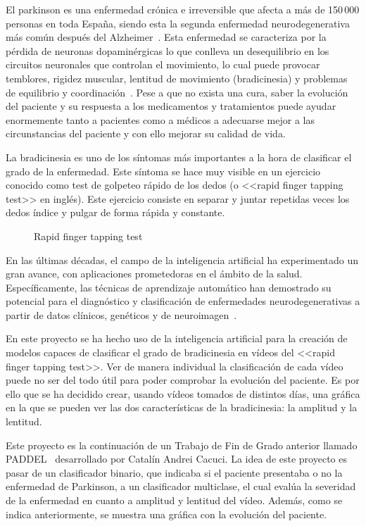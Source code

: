 
El parkinson es una enfermedad crónica e irreversible que afecta a más de 150\,000 personas en toda España, siendo esta la segunda enfermedad neurodegenerativa más común después del Alzheimer~\cite{brainsci11081027}. Esta enfermedad se caracteriza por la pérdida de neuronas dopaminérgicas lo que conlleva un desequilibrio en los circuitos neuronales que controlan el movimiento, lo cual puede provocar temblores, rigidez muscular, lentitud de movimiento (bradicinesia) y problemas de equilibrio y coordinación~\cite{Poewe_Seppi_Tanner_Halliday_Brundin_Volkmann_Schrag_Lang_2017}.
Pese a que no exista una cura, saber la evolución del paciente y su respuesta a los medicamentos y tratamientos puede ayudar enormemente tanto a pacientes como a médicos a adecuarse mejor a las circunstancias del paciente y con ello mejorar su calidad de vida.
 
La bradicinesia es uno de los síntomas más importantes a la hora de clasificar el grado de la enfermedad. Este síntoma se hace muy visible en un ejercicio conocido como test de golpeteo rápido de los dedos (o <<rapid finger tapping test>> en inglés). Este ejercicio consiste en separar y juntar repetidas veces los dedos índice y pulgar de forma rápida y constante.


\begin{figure}
    \centering
    \caption{Rapid finger tapping test}
    \label{fig:finger-tapping-test}
\end{figure}

En las últimas décadas, el campo de la inteligencia artificial ha experimentado un gran avance, con aplicaciones prometedoras en el ámbito de la salud. Específicamente, las técnicas de aprendizaje automático han demostrado su potencial para el diagnóstico y clasificación de enfermedades neurodegenerativas a partir de datos clínicos, genéticos y de neuroimagen~\cite{CardiacCare}.

En este proyecto se ha hecho uso de la inteligencia artificial para la creación de modelos capaces de clasificar el grado de bradicinesia en vídeos del <<rapid finger tapping test>>. Ver de manera individual la clasificación de cada vídeo puede no ser del todo útil para poder comprobar la evolución del paciente. Es por ello que se ha decidido crear, usando vídeos tomados de distintos días, una gráfica en la que se pueden ver las dos características de la bradicinesia: la amplitud y la lentitud. 

Este proyecto es la continuación de un Trabajo de Fin de Grado anterior llamado PADDEL~\cite{paddelRepo} desarrollado por Catalín Andrei Cacuci. La idea de este proyecto es pasar de un clasificador binario, que indicaba si el paciente presentaba o no la enfermedad de Parkinson, a un clasificador multiclase, el cual evalúa la severidad de la enfermedad en cuanto a amplitud y lentitud del vídeo. Además, como se indica anteriormente, se muestra una gráfica con la evolución del paciente.